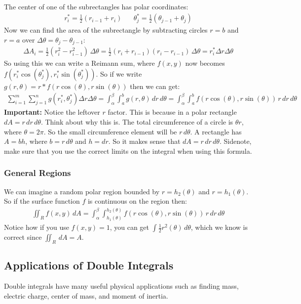 \documentclass{article}
\begin{document}
The center of one of the subrectangles has polar coordinates:
\begin{gather*}
    r_i^* = \frac{1}{2}(r_{i-1} + r_i)\hspace{20pt}\theta_j^* = \frac{1}{2}(\theta_{j-1} + \theta_j)
\end{gather*}
Now we can find the area of the subrectangle by subtracting circles $r = b$ and $r = a$ over $\Delta \theta = \theta_j - \theta_{j-1}$:
\begin{gather*}
    \Delta A_i = \frac{1}{2}(r_i^2 - r_{i-1}^2) \,\Delta \theta = \frac{1}{2}(r_i + r_{i-1})(r_i - r_{i-1}) \,\Delta \theta = r_i^* \Delta r \Delta \theta
\end{gather*}
So using this we can write a Reimann sum, where $f(x,y)$ now becomes $f(r_i^* \cos(\theta_j^*), r_i^* \sin(\theta_j^*))$. So if we write $g(r,\theta) = r * f(r\cos(\theta),r\sin(\theta))$ then we can get:
\begin{gather*}
    \sum_{i=1}^m\sum_{j=1}^n g(r_i^*,\theta_j^*) \Delta r \Delta \theta = \int_\alpha^\beta \int_a^b g(r,\theta) \,dr \,d\theta = \int_\alpha^\beta \int_a^b f(r \cos(\theta), r \sin(\theta))\,r\,dr\,d\theta
\end{gather*}
\textbf{Important:} Notice the leftover $r$ factor. This is because in a polar rectangle $dA = r\,dr\,d\theta$. Think about why this is. The total circumference of a circle is $\theta r$, where $\theta = 2\pi$. So the small circumference element will be $r \, d\theta$. A rectangle has $A = bh$, where $b = r \, d\theta$ and $h = dr$. So it makes sense that $dA = r\,dr\,d\theta$. Sidenote, make sure that you use the correct limits on the integral when using this formula.
\subsubsection{General Regions}
We can imagine a random polar region bounded by $r = h_2(\theta)$ and $r = h_1(\theta)$. So if the surface function $f$ is continuous on the region then:
\begin{gather*}
    \iint_R f(x,y) \, dA = \int_\alpha^\beta \int_{h_1(\theta)}^{h_2(\theta)} f(r \cos(\theta), r \sin(\theta))\,r\,dr\,d\theta
\end{gather*}
Notice how if you use $f(x,y) = 1$, you can get $\int \frac{1}{2} r^2(\theta) \, d\theta$, which we know is correct since $\iint_R \, dA = A$.
\subsection{Applications of Double Integrals}
Double integrals have many useful physical applications such as finding mass, electric charge, center of mass, and moment of inertia.
\end{document}
